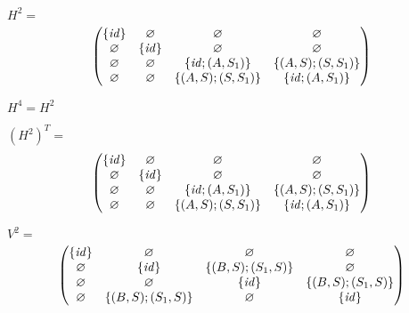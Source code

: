 \documentclass[12pt]{article}  %
\theoremstyle{definition}
\theoremstyle{remark}
\begin{document}
$H^2=$
\begin{align*}
\begin{pmatrix}
      \{ \text{\emph{id}} \} & \varnothing            & \varnothing            & \varnothing            \\
      \varnothing            & \{ \text{\emph{id}} \} & \varnothing            & \varnothing            \\
      \varnothing            & \varnothing            & \{ \text{\emph{id}}; (A,S_1) \} & \{(A,S);(S,S_1)\}      \\
      \varnothing            & \varnothing            & \{(A,S);(S,S_1)\}      & \{ \text{\emph{id}}; (A,S_1) \}  \\
\end{pmatrix}
\end{align*}

$H^4 = H^2$

$(H^2)^T=$
\begin{align*}
\begin{pmatrix}
      \{ \text{\emph{id}} \} & \varnothing            & \varnothing            & \varnothing            \\
      \varnothing            & \{ \text{\emph{id}} \} & \varnothing            & \varnothing            \\
      \varnothing            & \varnothing            & \{ \text{\emph{id}}; (A,S_1) \} & \{(A,S);(S,S_1)\}      \\
      \varnothing            & \varnothing            & \{(A,S);(S,S_1)\}      & \{ \text{\emph{id}}; (A,S_1) \}  \\
\end{pmatrix}
\end{align*}



$V^2=$
\begin{align*}
\begin{pmatrix}
      \{ \text{\emph{id}} \}       & \varnothing       & \varnothing       & \varnothing  \\ 
      \varnothing       & \{ \text{\emph{id}} \}       & \{(B,S);(S_1,S)\} & \varnothing  \\
      \varnothing       & \varnothing       & \{ \text{\emph{id}} \}       & \{(B,S);(S_1,S)\}  \\
      \varnothing       & \{(B,S);(S_1,S)\} & \varnothing       & \{ \text{\emph{id}} \}  \\
\end{pmatrix}
\end{align*}
\end{document}
